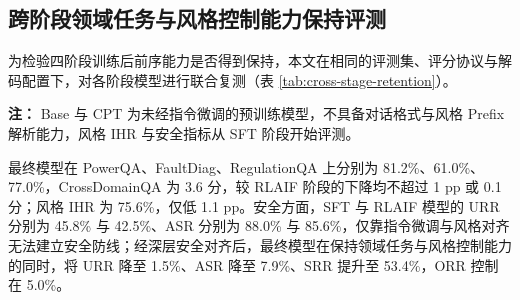\documentclass[fontset=fandol,type=master,campus=shenzhen,etitleauto=true]{hithesisbook}
\begin{document}
\subsection{跨阶段领域任务与风格控制能力保持评测}\label{cross-stage-retention}

为检验四阶段训练后前序能力是否得到保持，本文在相同的评测集、评分协议与解码配置下，对各阶段模型进行联合复测（表 \ref{tab:cross-stage-retention}）。

\begin{table}[htbp]
\centering
\caption{四阶段模型的领域任务、风格控制与安全合规联合评测矩阵}
\label{tab:cross-stage-retention}
\small
\setlength{\tabcolsep}{3.5pt}
\renewcommand{\arraystretch}{1.15}

\vspace{0.2cm}
{\small \textbf{注：} Base 与 CPT 为未经指令微调的预训练模型，不具备对话格式与风格 Prefix 解析能力，风格 IHR 与安全指标从 SFT 阶段开始评测。}
\end{table}

最终模型在 PowerQA、FaultDiag、RegulationQA 上分别为 81.2\%、61.0\%、77.0\%，CrossDomainQA 为 3.6 分，较 RLAIF 阶段的下降均不超过 1 pp 或 0.1 分；风格 IHR 为 75.6\%，仅低 1.1 pp。安全方面，SFT 与 RLAIF 模型的 URR 分别为 45.8\% 与 42.5\%、ASR 分别为 88.0\% 与 85.6\%，仅靠指令微调与风格对齐无法建立安全防线；经深层安全对齐后，最终模型在保持领域任务与风格控制能力的同时，将 URR 降至 1.5\%、ASR 降至 7.9\%、SRR 提升至 53.4\%，ORR 控制在 5.0\%。
\end{document}

